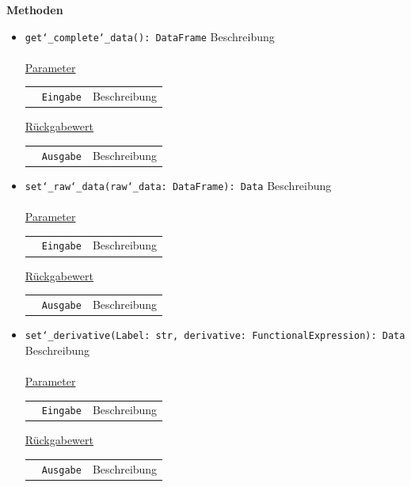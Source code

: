 \documentclass{article}
\begin{document}
\textbf{{Methoden}}
\begin{itemize}
\item \texttt{get\char`_complete\char`_data(): DataFrame} \newline Beschreibung
\\\\
\underline{{Parameter}}

\begin{tabular}{lll}
 & \texttt{Eingabe} & Beschreibung \\
\end{tabular}

\underline{{Rückgabewert}}

\begin{tabular}{lll}
 & \texttt{Ausgabe} & Beschreibung \\
\end{tabular}

\item \texttt{set\char`_raw\char`_data(raw\char`_data: DataFrame): Data} \newline Beschreibung
\\\\
\underline{{Parameter}}

\begin{tabular}{lll}
 & \texttt{Eingabe} & Beschreibung \\
\end{tabular}

\underline{{Rückgabewert}}

\begin{tabular}{lll}
 & \texttt{Ausgabe} & Beschreibung \\
\end{tabular}

\item \texttt{set\char`_derivative(Label: str, derivative: FunctionalExpression): Data} \newline Beschreibung
\\\\
\underline{{Parameter}}

\begin{tabular}{lll}
 & \texttt{Eingabe} & Beschreibung \\
\end{tabular}

\underline{{Rückgabewert}}

\begin{tabular}{lll}
 & \texttt{Ausgabe} & Beschreibung \\
\end{tabular}
\end{itemize}
\end{document}

